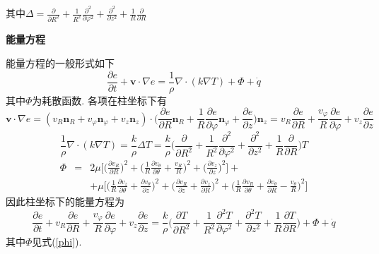 \begin{solution}
\noindent 其中$\Delta = \frac{\partial}{\partial R^2} +
\frac{1}{R^2}\frac{\partial^2}{\partial\varphi^2}+
\frac{\partial^2}{\partial z^2}+
\frac{1}{R}\frac{\partial}{\partial R}$

\vspace{0.75em}
\noindent\textbf{能量方程}
\vspace{0.75em}

\noindent 能量方程的一般形式如下
\[
\frac{\partial e}{\partial t} +\mathbf{v}\cdot\nabla e = \frac{1}{\rho}\nabla\cdot(k\nabla T) + \Phi + \dot{q}
\]
其中$\Phi$为耗散函数. 各项在柱坐标下有
\[
\mathbf{v}\cdot\nabla e = (v_R\mathbf{n}_R + v_\varphi\mathbf{n}_\varphi + v_z\mathbf{n}_z)\cdot\Big(\frac{\partial e}{\partial R}\mathbf{n}_R
+ \frac{1}{R}\frac{\partial e}{\partial\varphi}\mathbf{n}_\varphi
+ \frac{\partial e}{\partial z}\Big)\mathbf{n}_z
=
v_R\frac{\partial e}{\partial R}
+ \frac{v_\varphi}{R}\frac{\partial e}{\partial\varphi}
+ v_z\frac{\partial e}{\partial z}
\]
\[
\frac{1}{\rho}\nabla\cdot(k\nabla T) = \frac{k}{\rho}\Delta T= \frac{k}{\rho}
\Big(\frac{\partial}{\partial R^2} +
\frac{1}{R^2}\frac{\partial^2}{\partial\varphi^2}+
\frac{\partial^2}{\partial z^2}+
\frac{1}{R}\frac{\partial}{\partial R}
\Big)T
\]
{\setlength\arraycolsep{2pt}
\begin{eqnarray}\label{phi}
\Phi & = & 2\mu\Big[
\Big(\frac{\partial v_R}{\partial R}\Big)^2 +
\Big(\frac{1}{R}\frac{\partial v_\theta}{\partial\theta} + \frac{v_R}{R}\Big)^2 +
\Big(\frac{\partial v_z}{\partial z}\Big)^2
\Big] + \nonumber\\
& &+\mu\Big[
\Big(\frac{1}{R}\frac{\partial v_z}{\partial\theta} + \frac{\partial v_\theta}{\partial z}\Big)^2 +
\Big(\frac{\partial v_R}{\partial z} + \frac{\partial v_z}{\partial R}\Big)^2 +
\Big(\frac{1}{R}\frac{\partial v_R}{\partial\theta} + \frac{\partial v_\theta}{\partial R}-\frac{v_\theta}{R}\Big)^2
\Big]
\end{eqnarray}}
因此柱坐标下的能量方程为
\[
\frac{\partial e}{\partial t} +v_R\frac{\partial e}{\partial R}
+ \frac{v_\varphi}{R}\frac{\partial e}{\partial\varphi}
+ v_z\frac{\partial e}{\partial z}
= \frac{k}{\rho}
\Big(
\frac{\partial T}{\partial R^2} +
\frac{1}{R^2}\frac{\partial^2 T}{\partial\varphi^2}+
\frac{\partial^2 T}{\partial z^2}+
\frac{1}{R}\frac{\partial T}{\partial R}
\Big) + \Phi + \dot{q}
\]
其中$\Phi$见式(\ref{phi}).
\end{solution} 
